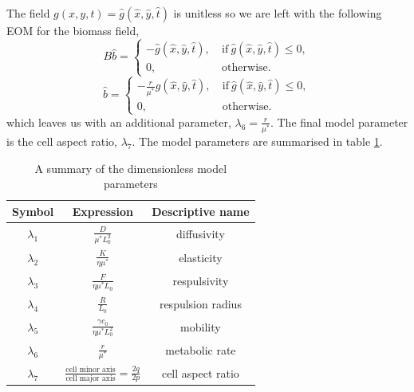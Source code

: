 The field $g(x,y,t) = \hat{g}(\hat{x},\hat{y},\hat{t})$ is unitless so we are left with the following EOM for the biomass field,
\begin{equation*}
    B\hat{b} = \begin{cases}
                -  \hat{g}(\hat{x},\hat{y},\hat{t}), & \ \textrm{if} \ \hat{g}(\hat{x},\hat{y},\hat{t}) \leq 0, \\
                    0, &    \ \textrm{otherwise}.
               \end{cases}
\end{equation*}
\begin{equation*}
    \hat{b} = \begin{cases}
                -  \frac{r}{\mu^*}\hat{g}(\hat{x},\hat{y},\hat{t}), & \ \textrm{if} \ \hat{g}(\hat{x},\hat{y},\hat{t}) \leq 0, \\
                    0, &    \ \textrm{otherwise}.
               \end{cases}
\end{equation*}
which leaves us with an additional parameter, $\lambda_6 =\frac{r}{\mu^*}$. The final model parameter is the cell aspect ratio, $\lambda_7$.
The model parameters are summarised in table \ref{table:VariableNames}.


\begin{table}[!htb]
\begin{center}
    \begin{tabular}{ |c|c|c| } 
     \hline
      \textbf{Symbol} & \textbf{Expression} & \textbf{Descriptive name} \\ 
      \hline
     $\lambda_1$ & $\frac{D}{ \mu^* L_0^2}$ & diffusivity \\ 
     $\lambda_2$ & $\frac{K}{ \eta \mu^*}$ & elasticity \\ 
     $\lambda_3$ & $\frac{F}{  \eta \mu^* L_0}$ & respulsivity \\ 
     $\lambda_4$ & $\frac{R}{L_0}$ & respulsion radius \\ 
     $\lambda_5$ & $\frac{\gamma c_0}{ \eta \mu^* L_0^2}$ & mobility \\ 
     $\lambda_6$ & $\frac{r}{\mu^*}$ & metabolic rate \\ 
     $\lambda_7$ & $\frac{\textrm{cell minor axis}}{\textrm{cell major axis}} = \frac{2q}{2p}$ & cell aspect ratio \\ 
     \hline
     
    \end{tabular}
    
\end{center}
\caption{A summary of the dimensionless model parameters}
\label{table:VariableNames}
\end{table}

